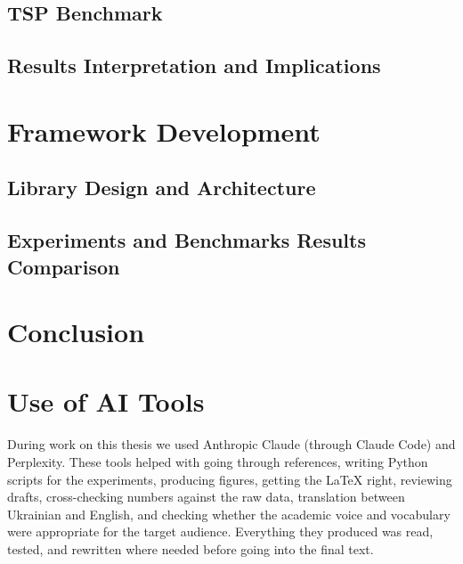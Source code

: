 

\newpage
\subsection{TSP Benchmark}



\subsection{Results Interpretation and Implications}



\section{Framework Development}

\subsection{Library Design and Architecture}



\newpage
\subsection{Experiments and Benchmarks Results Comparison}



\newpage
\section{Conclusion}



\newpage
\section*{Use of AI Tools}

During work on this thesis we used Anthropic Claude (through Claude Code) and Perplexity. These tools helped with going through references, writing Python scripts for the experiments, producing figures, getting the \LaTeX{} right, reviewing drafts, cross-checking numbers against the raw data, translation between Ukrainian and English, and checking whether the academic voice and vocabulary were appropriate for the target audience. Everything they produced was read, tested, and rewritten where needed before going into the final text.

